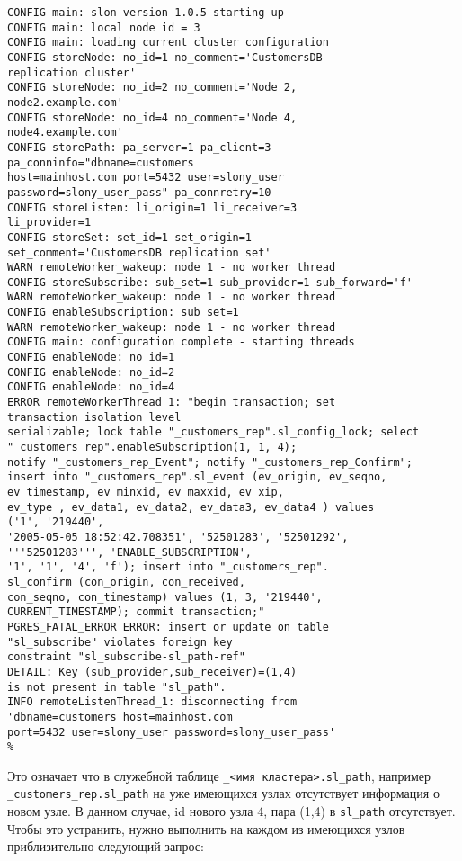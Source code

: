 \begin{lstlisting}[label=lst:slony17,caption=Устранение неисправностей]
%slon customers_rep "dbname=customers user=slony_user"
CONFIG main: slon version 1.0.5 starting up
CONFIG main: local node id = 3
CONFIG main: loading current cluster configuration
CONFIG storeNode: no_id=1 no_comment='CustomersDB
replication cluster'
CONFIG storeNode: no_id=2 no_comment='Node 2,
node2.example.com'
CONFIG storeNode: no_id=4 no_comment='Node 4,
node4.example.com'
CONFIG storePath: pa_server=1 pa_client=3
pa_conninfo="dbname=customers
host=mainhost.com port=5432 user=slony_user
password=slony_user_pass" pa_connretry=10
CONFIG storeListen: li_origin=1 li_receiver=3
li_provider=1
CONFIG storeSet: set_id=1 set_origin=1
set_comment='CustomersDB replication set'
WARN remoteWorker_wakeup: node 1 - no worker thread
CONFIG storeSubscribe: sub_set=1 sub_provider=1 sub_forward='f'
WARN remoteWorker_wakeup: node 1 - no worker thread
CONFIG enableSubscription: sub_set=1
WARN remoteWorker_wakeup: node 1 - no worker thread
CONFIG main: configuration complete - starting threads
CONFIG enableNode: no_id=1
CONFIG enableNode: no_id=2
CONFIG enableNode: no_id=4
ERROR remoteWorkerThread_1: "begin transaction; set
transaction isolation level
serializable; lock table "_customers_rep".sl_config_lock; select
"_customers_rep".enableSubscription(1, 1, 4);
notify "_customers_rep_Event"; notify "_customers_rep_Confirm";
insert into "_customers_rep".sl_event (ev_origin, ev_seqno,
ev_timestamp, ev_minxid, ev_maxxid, ev_xip,
ev_type , ev_data1, ev_data2, ev_data3, ev_data4 ) values
('1', '219440',
'2005-05-05 18:52:42.708351', '52501283', '52501292',
'''52501283''', 'ENABLE_SUBSCRIPTION',
'1', '1', '4', 'f'); insert into "_customers_rep".
sl_confirm (con_origin, con_received,
con_seqno, con_timestamp) values (1, 3, '219440',
CURRENT_TIMESTAMP); commit transaction;"
PGRES_FATAL_ERROR ERROR: insert or update on table
"sl_subscribe" violates foreign key
constraint "sl_subscribe-sl_path-ref"
DETAIL: Key (sub_provider,sub_receiver)=(1,4)
is not present in table "sl_path".
INFO remoteListenThread_1: disconnecting from
'dbname=customers host=mainhost.com
port=5432 user=slony_user password=slony_user_pass'
%
\end{lstlisting}

Это означает что в служебной таблице \lstinline!_<имя кластера>.sl_path!, например \lstinline!_customers_rep.sl_path! на уже имеющихся узлах отсутствует информация о новом узле. В данном случае, id нового узла 4, пара (1,4) в \lstinline!sl_path! отсутствует. Чтобы это устранить, нужно выполнить на каждом из имеющихся узлов приблизительно следующий запрос:

